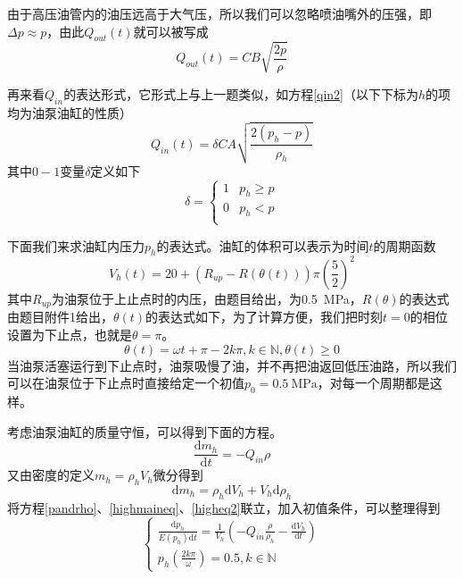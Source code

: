 \documentclass[12pt,AutoFakeBold]{article}%
\newcommand{\dif}{\mathrm{d}}
\begin{document}
    由于高压油管内的油压远高于大气压，所以我们可以忽略喷油嘴外的压强，即$\Delta p\approx p$，由此$Q_{out}(t)$就可以被写成
    \begin{equation}
        Q_{out}(t)=CB\sqrt{\frac{2p}{\rho}}
    \end{equation}\par
    再来看$Q_{in}$的表达形式，它形式上与上一题类似，如方程\ref{qin2}（以下下标为$h$的项均为油泵油缸的性质）
    \begin{equation}
        Q_{in}(t)=\delta CA\sqrt{\frac{2(p_h-p)}{\rho_h}}
        \label{qin2}
    \end{equation}
    其中$0-1$变量$\delta$定义如下
    \begin{equation}
        \delta=
        \begin{cases}
            1&p_h\geq p\\
            0&p_h<p\\
        \end{cases}
    \end{equation}\par
    下面我们来求油缸内压力$p_h$的表达式。油缸的体积可以表示为时间$t$的周期函数
    \begin{equation}
        V_h(t)=20+(R_{up}-R(\theta(t)))\pi\left(\frac{5}{2}\right)^2
    \end{equation}
    其中$R_{up}$为油泵位于上止点时的内压，由题目给出，为\SI{0.5}{\MPa}，$R(\theta)$的表达式由题目附件1给出，$\theta(t)$的表达式如下，为了计算方便，我们把时刻$t=0$的相位设置为下止点，也就是$\theta = \pi$。
    \begin{equation}
        \theta(t)=\omega t+\pi -2k\pi,k\in\mathbb{N},\theta(t)\geq0
    \end{equation}
    当油泵活塞运行到下止点时，油泵吸慢了油，并不再把油返回低压油路，所以我们可以在油泵位于下止点时直接给定一个初值$p_0=\SI{0.5}{\MPa}$，对每一个周期都是这样。\par
    考虑油泵油缸的质量守恒，可以得到下面的方程。
    \begin{equation}
        \frac{\dif m_h}{\dif t}=-Q_{in}\rho
        \label{highmaineq}
    \end{equation}
    又由密度的定义$m_h=\rho_hV_h$微分得到
    \begin{equation}
        \dif m_h=\rho_h\dif V_h+V_h\dif\rho_h
        \label{higheq2}
    \end{equation}
    将方程\ref{pandrho}、\ref{highmaineq}、\ref{higheq2}联立，加入初值条件，可以整理得到
    \begin{equation}
        \begin{cases}
            \frac{\dif p_h}{E(p_h)\dif t}=\frac{1}{V_h}\left(-Q_{in}\frac{\rho}{\rho_h}-\frac{\dif V_h}{\dif t}\right)\\
            p_h(\frac{2k\pi}{\omega})=0.5,k\in\mathbb{N}
        \end{cases}
        \label{highmaineq2}
    \end{equation}\par
\end{document}
